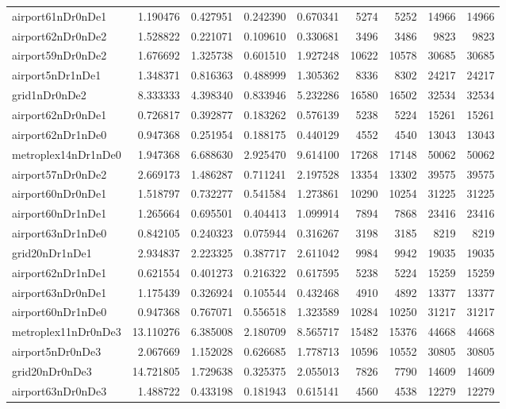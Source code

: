 \begin{longtable}{|l|r|r|r|r|r|r|r|r|}
airport61nDr0nDe1 & 1.190476 & 0.427951 & 0.242390 & 0.670341 & 5274 & 5252 & 14966 & 14966 \\
airport62nDr0nDe2 & 1.528822 & 0.221071 & 0.109610 & 0.330681 & 3496 & 3486 & 9823 & 9823 \\
airport59nDr0nDe2 & 1.676692 & 1.325738 & 0.601510 & 1.927248 & 10622 & 10578 & 30685 & 30685 \\
airport5nDr1nDe1 & 1.348371 & 0.816363 & 0.488999 & 1.305362 & 8336 & 8302 & 24217 & 24217 \\
grid1nDr0nDe2 & 8.333333 & 4.398340 & 0.833946 & 5.232286 & 16580 & 16502 & 32534 & 32534 \\
airport62nDr0nDe1 & 0.726817 & 0.392877 & 0.183262 & 0.576139 & 5238 & 5224 & 15261 & 15261 \\
airport62nDr1nDe0 & 0.947368 & 0.251954 & 0.188175 & 0.440129 & 4552 & 4540 & 13043 & 13043 \\
metroplex14nDr1nDe0 & 1.947368 & 6.688630 & 2.925470 & 9.614100 & 17268 & 17148 & 50062 & 50062 \\
airport57nDr0nDe2 & 2.669173 & 1.486287 & 0.711241 & 2.197528 & 13354 & 13302 & 39575 & 39575 \\
airport60nDr0nDe1 & 1.518797 & 0.732277 & 0.541584 & 1.273861 & 10290 & 10254 & 31225 & 31225 \\
airport60nDr1nDe1 & 1.265664 & 0.695501 & 0.404413 & 1.099914 & 7894 & 7868 & 23416 & 23416 \\
airport63nDr1nDe0 & 0.842105 & 0.240323 & 0.075944 & 0.316267 & 3198 & 3185 & 8219 & 8219 \\
grid20nDr1nDe1 & 2.934837 & 2.223325 & 0.387717 & 2.611042 & 9984 & 9942 & 19035 & 19035 \\
airport62nDr1nDe1 & 0.621554 & 0.401273 & 0.216322 & 0.617595 & 5238 & 5224 & 15259 & 15259 \\
airport63nDr0nDe1 & 1.175439 & 0.326924 & 0.105544 & 0.432468 & 4910 & 4892 & 13377 & 13377 \\
airport60nDr1nDe0 & 0.947368 & 0.767071 & 0.556518 & 1.323589 & 10284 & 10250 & 31217 & 31217 \\
metroplex11nDr0nDe3 & 13.110276 & 6.385008 & 2.180709 & 8.565717 & 15482 & 15376 & 44668 & 44668 \\
airport5nDr0nDe3 & 2.067669 & 1.152028 & 0.626685 & 1.778713 & 10596 & 10552 & 30805 & 30805 \\
grid20nDr0nDe3 & 14.721805 & 1.729638 & 0.325375 & 2.055013 & 7826 & 7790 & 14609 & 14609 \\
airport63nDr0nDe3 & 1.488722 & 0.433198 & 0.181943 & 0.615141 & 4560 & 4538 & 12279 & 12279 \\

\end{longtable}
